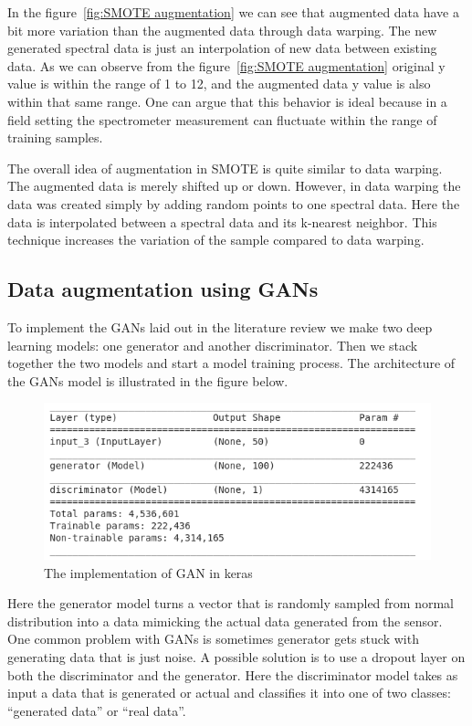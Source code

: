 In the figure~\ref{fig:SMOTE augmentation} we can see that augmented data have a bit more variation than the augmented data through data warping. The new generated spectral data is just an interpolation of new data between existing data. As we can observe from the figure~\ref{fig:SMOTE augmentation} original y value is within the range of 1 to 12, and the augmented data y value is also within that same range. One can argue that this behavior is ideal because in a field setting the spectrometer measurement can fluctuate within the range of training samples.  

The overall idea of augmentation in SMOTE is quite similar to data warping. The augmented data is merely shifted up or down. However, in data warping the data was created simply by adding random points to one spectral data. Here the data is interpolated between a spectral data and its k-nearest neighbor. This technique increases the variation of the sample compared to data warping.   
 
\subsection{Data augmentation using GANs}
To implement the GANs laid out in the literature review we make two deep learning models: one generator and another discriminator. Then we stack together the two models and start a model training process. The architecture of the GANs model is illustrated in the figure below.

\begin{figure}[ht]
	\begin{center}
		\includegraphics[width=\textwidth]{images/GAN_architecture.png}
		\caption{The implementation of GAN in keras}
		\label{fig:GAN architecture}
	\end{center}
\end{figure}

Here the generator model turns a vector that is randomly sampled from normal distribution into a data mimicking the actual data generated from the sensor. One common problem with GANs is sometimes generator gets stuck with generating data that is just noise. A possible solution is to use a dropout layer on both the discriminator and the generator. Here the discriminator model takes as input a data that is generated or actual and classifies it into one of two classes: ``generated data''  or  ``real data''.

